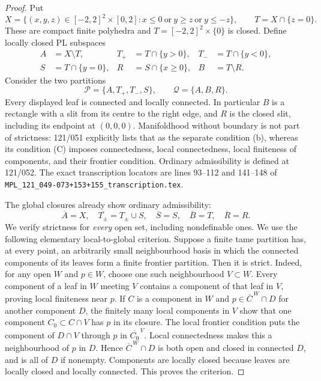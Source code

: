 \begin{proof}
Put
\[
 X=\{(x,y,z)\in[-2,2]^2\times[0,2]:
            x\leq0\ \text{or}\ y\geq z\ \text{or}\ y\leq-z\},
 \qquad T=X\cap\{z=0\}.
\]
These are compact finite polyhedra and $T=[-2,2]^2\times\{0\}$
is closed.  Define locally closed PL subspaces
\[
\begin{aligned}
 A&=X\setminus T,&
 T_+&=T\cap\{y>0\},&T_-&=T\cap\{y<0\},\\
 S&=T\cap\{y=0\},&
 R&=S\cap\{x\geq0\},&B&=T\setminus R.
\end{aligned}
\]
Consider the two partitions
\[
                \mathcal P=\{A,T_+,T_-,S\},\qquad
                \mathcal Q=\{A,B,R\}.                 \tag{A5.9.1}
\]
Every displayed leaf is connected and locally connected.  In
particular $B$ is a rectangle with a slit from its centre to the
right edge, and $R$ is the closed slit, including its endpoint at
$(0,0,0)$.  Manifoldhood without boundary is not part of strictness:
121/051 explicitly lists that as the separate condition (b), whereas
its condition (C) imposes connectedness, local connectedness, local
finiteness of components, and their frontier condition.  Ordinary
admissibility is defined at 121/052.  The exact transcription
locators are lines 93--112 and 141--148 of
\texttt{MPL\_121\_049-073+153+155\_transcription.tex}.

The global closures already show ordinary admissibility:
\[
 \overline A=X,\quad \overline{T_\pm}=T_\pm\cup S,
 \quad\overline S=S,\quad\overline B=T,\quad\overline R=R.
                                                               \tag{A5.9.2}
\]
We verify strictness for \emph{every} open set, including
nondefinable ones.  We use the following elementary local-to-global
criterion.  Suppose a finite tame partition has, at every point, an
arbitrarily small neighbourhood basis in which the connected
components of its leaves form a finite frontier partition.  Then
it is strict.  Indeed, for any open $W$ and $p\in W$, choose one
such neighbourhood $V\subset W$.  Every component of a leaf in $W$
meeting $V$ contains a component of that leaf in $V$, proving local
finiteness near $p$.  If $C$ is a component in $W$ and
$p\in\overline C^{\,W}\cap D$ for another component $D$, the
finitely many local components in $V$ show that one component
$C_0\subset C\cap V$ has $p$ in its closure.  The local frontier
condition puts the component of $D\cap V$ through $p$ in
$\overline{C_0}^{\,V}$.  Local connectedness makes this a
neighbourhood of $p$ in $D$.  Hence $\overline C^{\,W}\cap D$ is
both open and closed in connected $D$, and is all of $D$ if nonempty.
Components are locally closed because leaves are locally closed
and locally connected.  This proves the criterion.


\end{proof}
